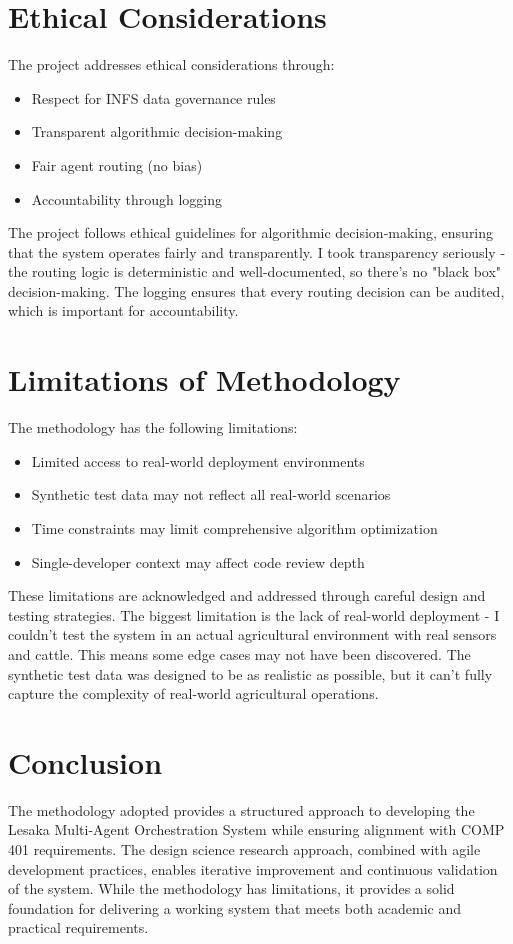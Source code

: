 \section{Ethical Considerations}

The project addresses ethical considerations through:

\begin{itemize}
    \item Respect for INFS data governance rules
    \item Transparent algorithmic decision-making
    \item Fair agent routing (no bias)
    \item Accountability through logging
\end{itemize}

The project follows ethical guidelines for algorithmic decision-making, ensuring that the system operates fairly and transparently. I took transparency seriously - the routing logic is deterministic and well-documented, so there's no "black box" decision-making. The logging ensures that every routing decision can be audited, which is important for accountability.

\section{Limitations of Methodology}

The methodology has the following limitations:

\begin{itemize}
    \item Limited access to real-world deployment environments
    \item Synthetic test data may not reflect all real-world scenarios
    \item Time constraints may limit comprehensive algorithm optimization
    \item Single-developer context may affect code review depth
\end{itemize}

These limitations are acknowledged and addressed through careful design and testing strategies. The biggest limitation is the lack of real-world deployment - I couldn't test the system in an actual agricultural environment with real sensors and cattle. This means some edge cases may not have been discovered. The synthetic test data was designed to be as realistic as possible, but it can't fully capture the complexity of real-world agricultural operations.

\section{Conclusion}

The methodology adopted provides a structured approach to developing the Lesaka Multi-Agent Orchestration System while ensuring alignment with COMP 401 requirements. The design science research approach, combined with agile development practices, enables iterative improvement and continuous validation of the system. While the methodology has limitations, it provides a solid foundation for delivering a working system that meets both academic and practical requirements.
